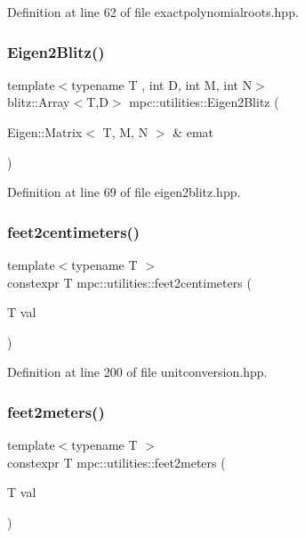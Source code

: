 Definition at line 62 of file exactpolynomialroots.\+hpp.

\mbox{\label{namespacempc_1_1utilities_a08e3db41de91c76d936475136d35da9e}} 
\subsubsection{\texorpdfstring{Eigen2\+Blitz()}{Eigen2Blitz()}}
{\footnotesize\ttfamily template$<$typename T , int D, int M, int N$>$ \\
blitz\+::\+Array$<$T,D$>$ mpc\+::utilities\+::\+Eigen2\+Blitz (\begin{DoxyParamCaption}\item[{Eigen\+::\+Matrix$<$ T, M, N $>$ \&}]{emat }\end{DoxyParamCaption})}



Definition at line 69 of file eigen2blitz.\+hpp.

\mbox{\label{namespacempc_1_1utilities_a6865996c35cf22c64dcfec367de015d1}} 
\subsubsection{\texorpdfstring{feet2centimeters()}{feet2centimeters()}}
{\footnotesize\ttfamily template$<$typename T $>$ \\
constexpr T mpc\+::utilities\+::feet2centimeters (\begin{DoxyParamCaption}\item[{T}]{val }\end{DoxyParamCaption})}



Definition at line 200 of file unitconversion.\+hpp.

\mbox{\label{namespacempc_1_1utilities_a20f0094ce9908b1196a4b0c93d268915}} 
\subsubsection{\texorpdfstring{feet2meters()}{feet2meters()}}
{\footnotesize\ttfamily template$<$typename T $>$ \\
constexpr T mpc\+::utilities\+::feet2meters (\begin{DoxyParamCaption}\item[{T}]{val }\end{DoxyParamCaption})}



